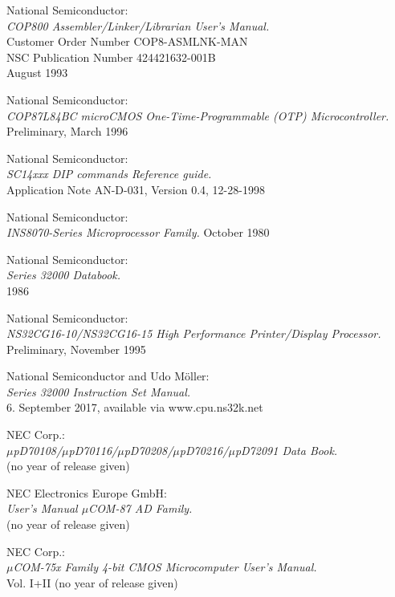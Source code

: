  National Semiconductor: \\
		{\em COP800 Assembler/Linker/Librarian User's
		Manual.\/} \\
		Customer Order Number COP8-ASMLNK-MAN \\
		NSC Publication Number 424421632-001B \\
		August 1993

 National Semiconductor: \\
		{\em COP87L84BC microCMOS One-Time-Programmable (OTP)
		Microcontroller.\/} \\
		Preliminary, March 1996

 National Semiconductor: \\
		{\em SC14xxx DIP commands Reference guide.} \\
		Application Note AN-D-031, Version 0.4, 12-28-1998

 National Semiconductor: \\
		{\em INS8070-Series Microprocessor Family.\/}
		October 1980

 National Semiconductor: \\
		{\em Series 32000 Databook.\/} \\
		1986

 National Semiconductor: \\
		{\em NS32CG16-10/NS32CG16-15 High Performance Printer/Display Processor.\/} \\
		Preliminary, November 1995

 National Semiconductor and Udo M\"oller: \\
		{\em Series 32000 Instruction Set Manual.\/} \\
		6. September 2017, available via www.cpu.ns32k.net

 NEC Corp.: \\
		{\em $\mu$pD70108/$\mu$pD70116/$\mu$pD70208/$\mu$pD70216/$\mu$pD72091
		Data Book.\/} \\
		(no year of release given)

 NEC Electronics Europe GmbH: \\
		{\em User's Manual $\mu$COM-87 AD Family.\/} \\
		(no year of release given)

 NEC Corp.: \\
		{\em $\mu$COM-75x Family 4-bit CMOS Microcomputer User's
		Manual.\/} \\
		Vol. I+II (no year of release given)

